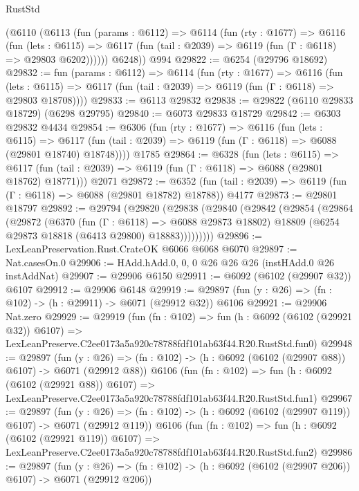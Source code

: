 \begin{lexlean}{RustStd}
\begin{coremodule}
      (@6110
        (@6113
          (fun (params : @6112) =>
          @6114
            (fun (rty : @1677) =>
            @6116
              (fun (lets : @6115) =>
              @6117 (fun (tail : @2039) => @6119 (fun (Γ : @6118) => @29803 @6202))))))
        @6248))
    @994
@29822 := @6254 (@29796 @18692)
@29832 := fun (params : @6112) =>
  @6114
    (fun (rty : @1677) =>
    @6116
      (fun (lets : @6115) =>
      @6117 (fun (tail : @2039) => @6119 (fun (Γ : @6118) => @29803 @18708))))
@29833 := @6113 @29832
@29838 := @29822 (@6110 @29833 @18729) (@6298 @29795)
@29840 := @6073 @29833 @18729
@29842 := @6303 @29832 @4434
@29854 := @6306
    (fun (rty : @1677) =>
    @6116
      (fun (lets : @6115) =>
      @6117 (fun (tail : @2039) => @6119 (fun (Γ : @6118) => @6088 (@29801 @18740) @18748))))
    @1785
@29864 := @6328
    (fun (lets : @6115) =>
    @6117 (fun (tail : @2039) => @6119 (fun (Γ : @6118) => @6088 (@29801 @18762) @18771)))
    @2071
@29872 := @6352
    (fun (tail : @2039) => @6119 (fun (Γ : @6118) => @6088 (@29801 @18782) @18788))
    @4177
@29873 := @29801 @18797
@29892 := @29794
    (@29820
      (@29838
        (@29840
          (@29842
            (@29854
              (@29864
                (@29872
                  (@6370
                    (fun (Γ : @6118) => @6088 @29873 @18802)
                    @18809
                    (@6254 @29873 @18818 (@6413 @29800) @18883)))))))))
@29896 := LexLeanPreservation.Rust.CrateOK @6066 @6068 @6070
@29897 := Nat.casesOn.{0}
@29906 := HAdd.hAdd.{0, 0, 0} @26 @26 @26 (instHAdd.{0} @26 instAddNat)
@29907 := @29906 @6150
@29911 := @6092 (@6102 (@29907 @32)) @6107
@29912 := @29906 @6148
@29919 := @29897 (fun (y : @26) => (fn : @102) -> (h : @29911) -> @6071 (@29912 @32)) @6106
@29921 := @29906 Nat.zero
@29929 := @29919
    (fun (fn : @102) =>
    fun (h : @6092 (@6102 (@29921 @32)) @6107) =>
    LexLeanPreserve.C2ee0173a5a920c78788fdf101ab63f44.R20.RustStd.fun0)
@29948 := @29897
    (fun (y : @26) => (fn : @102) -> (h : @6092 (@6102 (@29907 @88)) @6107) -> @6071 (@29912 @88))
    @6106
    (fun (fn : @102) =>
    fun (h : @6092 (@6102 (@29921 @88)) @6107) =>
    LexLeanPreserve.C2ee0173a5a920c78788fdf101ab63f44.R20.RustStd.fun1)
@29967 := @29897
    (fun (y : @26) => (fn : @102) -> (h : @6092 (@6102 (@29907 @119)) @6107) -> @6071 (@29912 @119))
    @6106
    (fun (fn : @102) =>
    fun (h : @6092 (@6102 (@29921 @119)) @6107) =>
    LexLeanPreserve.C2ee0173a5a920c78788fdf101ab63f44.R20.RustStd.fun2)
@29986 := @29897
    (fun (y : @26) => (fn : @102) -> (h : @6092 (@6102 (@29907 @206)) @6107) -> @6071 (@29912 @206))

\end{coremodule}
\end{lexlean}
